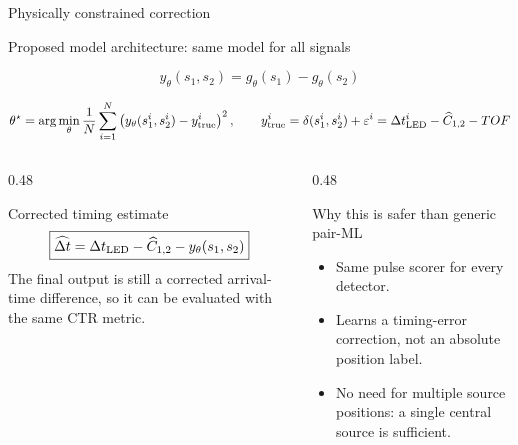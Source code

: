 \begin{frame}{Physically constrained correction}
\small
\vspace{-2mm}
\begin{block}{Proposed model architecture: same model for all signals}

\large
\[
\boxed{y_\theta(s_1,s_2)=g_\theta(s_1)-g_\theta(s_2)}
\]

\small
\[
\theta^\star=\arg\min_\theta\frac{1}{N}\sum_{i=1}^{N}\left(y_\theta(s_{1}^i,s_{2}^i)-y^i_{\mathrm{true}}\right)^2,
\qquad
y^i_{\mathrm{true}}=\delta(s_{1}^i,s_{2}^i)+\varepsilon^i
=\Delta t_{\operatorname{LED}}^i-\widehat C_{1,2}-TOF
\]
\end{block}

\vspace{0.15em}

\begin{columns}[T,totalwidth=\textwidth]
\begin{column}{0.48\textwidth}
\begin{alertblock}{Corrected timing estimate}
\large
\[
\boxed{
\widehat{\Delta t}=\Delta t_{\operatorname{LED}}-\widehat C_{1,2}-y_\theta(s_1,s_2)
}
\]
\small
The final output is still a corrected arrival-time difference, so it can be evaluated with the same CTR metric.
\end{alertblock}
\end{column}

\begin{column}{0.48\textwidth}
\begin{block}{Why this is safer than generic pair-ML}
\begin{itemize}
  \item Same pulse scorer for every detector.
  \item Learns a timing-error correction, not an absolute position label.
  \item No need for multiple source positions: a single central source is sufficient.
\end{itemize}
\end{block}
\end{column}
\end{columns}

\vspace{0.25em}
\end{frame}
